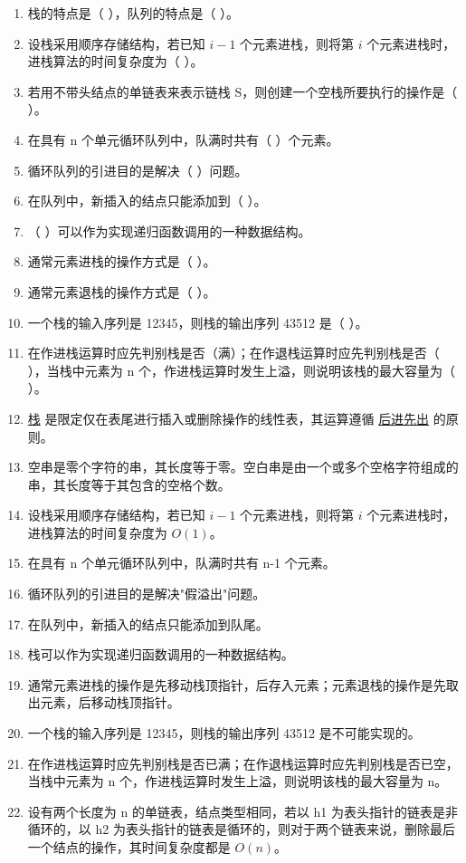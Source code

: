 \documentclass[12pt, a4paper]{article}
\begin{document}
\begin{enumerate}
	\item 栈的特点是（ ），队列的特点是（ ）。
	\item 设栈采用顺序存储结构，若已知 $i-1$ 个元素进栈，则将第 $i$ 个元素进栈时，进栈算法的时间复杂度为（ ）。
	\item 若用不带头结点的单链表来表示链栈 S，则创建一个空栈所要执行的操作是（ ）。
	\item 在具有 n 个单元循环队列中，队满时共有（ ）个元素。
	\item 循环队列的引进目的是解决（ ）问题。
	\item 在队列中，新插入的结点只能添加到（ ）。
	\item （ ）可以作为实现递归函数调用的一种数据结构。
	\item 通常元素进栈的操作方式是（ ）。
	\item 通常元素退栈的操作方式是（ ）。
	\item 一个栈的输入序列是 12345，则栈的输出序列 43512 是（ ）。
	\item 在作进栈运算时应先判别栈是否（满）；在作退栈运算时应先判别栈是否（ ），当栈中元素为 n 个，作进栈运算时发生上溢，则说明该栈的最大容量为（ ）。
	\item \underline{栈} 是限定仅在表尾进行插入或删除操作的线性表，其运算遵循 \underline{后进先出} 的原则。
	\item 空串是零个字符的串，其长度等于零。空白串是由一个或多个空格字符组成的串，其长度等于其包含的空格个数。
	\item 设栈采用顺序存储结构，若已知 $i-1$ 个元素进栈，则将第 $i$ 个元素进栈时，进栈算法的时间复杂度为 $O(1)$。
	\item 在具有 n 个单元循环队列中，队满时共有 n-1 个元素。
	\item 循环队列的引进目的是解决"假溢出"问题。
	\item 在队列中，新插入的结点只能添加到队尾。
	\item 栈可以作为实现递归函数调用的一种数据结构。
	\item 通常元素进栈的操作是先移动栈顶指针，后存入元素；元素退栈的操作是先取出元素，后移动栈顶指针。
	\item 一个栈的输入序列是 12345，则栈的输出序列 43512 是不可能实现的。
	\item 在作进栈运算时应先判别栈是否已满；在作退栈运算时应先判别栈是否已空，当栈中元素为 n 个，作进栈运算时发生上溢，则说明该栈的最大容量为 n。
	\item 设有两个长度为 n 的单链表，结点类型相同，若以 h1 为表头指针的链表是非循环的，以 h2 为表头指针的链表是循环的，则对于两个链表来说，删除最后一个结点的操作，其时间复杂度都是 $O(n)$。
\end{enumerate}
\end{document}
